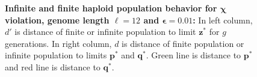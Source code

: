 \begin{figure}[ht]
\begin{center}
\hspace{-3em}%
\vspace{-0.5em} \hspace{-3em}%


\caption[\textbf{Infinite and finite haploid population behavior for $\bm{\chi}$ violation, genome length $\ell = 12$ and $\bm{\epsilon} = 0.01$}]{\textbf{Infinite and finite haploid population behavior for $\bm{\chi}$ violation, genome length $\ell = 12$ and $\bm{\epsilon} = 0.01$:} 
  In left column, $d'$ is distance of finite or infinite population to limit $\bm{z}^\ast$ for $g$ generations. In right column, $d$ is distance of finite population or infinite population to limits $\bm{p}^\ast$ and $\bm{q}^\ast$. Green line is distance to $\bm{p}^\ast$ and red line is distance to $\bm{q}^\ast$.}
\label{oscillation_12h_vio_chi_0.01}
\end{center}
\end{figure}

